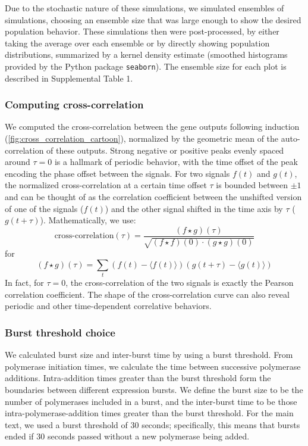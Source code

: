 \documentclass[11pt]{article} %
\begin{document}
Due to the stochastic nature of these simulations, we simulated ensembles of simulations, choosing an ensemble size that was large enough to show the desired population behavior. These simulations then were post-processed, by either taking the average over each ensemble or by directly showing population distributions, summarized by a kernel density estimate (smoothed histograms provided by the Python package \texttt{seaborn}). The ensemble size for each plot is described in Supplemental Table 1.



\FloatBarrier
\subsubsection{Computing cross-correlation} \label{sec:supp:cross_correlation}
We computed the cross-correlation between the gene outputs following induction (\cref{fig:cross_correlation_cartoon}), normalized by the geometric mean of the auto-correlation of these outputs.  Strong negative or positive peaks evenly spaced around \(\tau = 0\) is a hallmark of periodic behavior, with the time offset of the peak encoding the phase offset between the signals. For two signals \(f(t)\) and \(g(t)\), the normalized cross-correlation at a certain time offset \(\tau\) is bounded between \(\pm1\) and can be thought of as the correlation coefficient between the unshifted version of one of the signals (\(f(t)\)) and the other signal shifted in the time axis by \(\tau\) (\(g(t + \tau)\)). Mathematically, we use:
\begin{equation}
\text{cross-correlation}(\tau) = \frac{(f \star g)(\tau)}{\sqrt{(f \star f)(0) \cdot (g \star g)(0)}}
\end{equation}
for
\begin{equation}
    (f \star g)(\tau) = \sum_t (f(t) - \langle f(t)\rangle)(g(t+\tau) - \langle g(t)\rangle)
\end{equation}
In fact, for \(\tau = 0\), the cross-correlation of the two signals is exactly the Pearson correlation coefficient. The shape of the cross-correlation curve can also reveal periodic and other time-dependent correlative behaviors.

\subsubsection{Burst threshold choice} \label{sec:supp:burst_threshold}
We calculated burst size and inter-burst time by using a burst threshold. From polymerase initiation times, we calculate the time between successive polymerase additions. Intra-addition times greater than the burst threshold form the boundaries between different expression bursts. We define the burst size to be the number of polymerases included in a burst, and the inter-burst time to be those intra-polymerase-addition times greater than the burst threshold. For the main text, we used a burst threshold of 30 seconds; specifically, this means that bursts ended if 30 seconds passed without a new polymerase being added.
\end{document}

